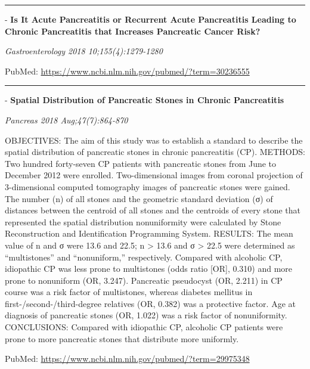 \documentclass[]{article}
\begin{document}
\begin{center}\rule{0.5\linewidth}{\linethickness}\end{center}

 - \textbf{Is It Acute Pancreatitis or Recurrent Acute Pancreatitis
Leading to Chronic Pancreatitis that Increases Pancreatic Cancer Risk?}

\emph{Gastroenterology 2018 10;155(4):1279-1280}

PubMed: \url{https://www.ncbi.nlm.nih.gov/pubmed/?term=30236555}

{}

{}

\begin{center}\rule{0.5\linewidth}{\linethickness}\end{center}

 - \textbf{Spatial Distribution of Pancreatic Stones in Chronic
Pancreatitis}

\emph{Pancreas 2018 Aug;47(7):864-870}

OBJECTIVES: The aim of this study was to establish a standard to
describe the spatial distribution of pancreatic stones in chronic
pancreatitis (CP). METHODS: Two hundred forty-seven CP patients with
pancreatic stones from June to December 2012 were enrolled.
Two-dimensional images from coronal projection of 3-dimensional computed
tomography images of pancreatic stones were gained. The number (n) of
all stones and the geometric standard deviation (σ) of distances between
the centroid of all stones and the centroids of every stone that
represented the spatial distribution nonuniformity were calculated by
Stone Reconstruction and Identification Programming System. RESULTS: The
mean value of n and σ were 13.6 and 22.5; n \textgreater{} 13.6 and σ
\textgreater{} 22.5 were determined as ``multistones'' and
``nonuniform,'' respectively. Compared with alcoholic CP, idiopathic CP
was less prone to multistones (odds ratio {[}OR{]}, 0.310) and more
prone to nonuniform (OR, 3.247). Pancreatic pseudocyst (OR, 2.211) in CP
course was a risk factor of multistones, whereas diabetes mellitus in
first-/second-/third-degree relatives (OR, 0.382) was a protective
factor. Age at diagnosis of pancreatic stones (OR, 1.022) was a risk
factor of nonuniformity. CONCLUSIONS: Compared with idiopathic CP,
alcoholic CP patients were prone to more pancreatic stones that
distribute more uniformly.

PubMed: \url{https://www.ncbi.nlm.nih.gov/pubmed/?term=29975348}

{}
\end{document}

